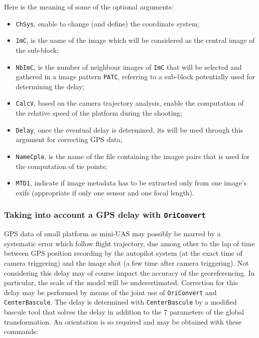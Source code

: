 Here is the meaning of some of the optional arguments:

\begin{itemize}
    \item {\tt ChSys}, enable to change (and define) the coordinate system;
    \item {\tt ImC}, is the name of the image which will be considered as the central image of the sub-block;
    \item {\tt NbImC}, is the number of neighbour images of {\tt ImC} that will be selected and gathered in a image pattern {\tt PATC}, referring to a sub-block potentially used for determining the delay;
                \item {\tt CalcV}, based on the camera trajectory analysis, enable the computation of the relative speed of the platform during the shooting;
                \item {\tt Delay}, once the eventual delay is determined, its will be used through this argument for correcting GPS data;
                \item {\tt NameCple}, is the name of the file containing the images pairs that is used for the computation of tie points;
                \item {\tt MTD1}, indicate if image metadata has to be extracted only from one image's exifs (appropriate if only one sensor and one focal length).
\end{itemize}
\vspace{\baselineskip}

\subsubsection{Taking into account a GPS delay with {\tt OriConvert}}\label{OriConvert:GPSdelay}

GPS data of small platform as mini-UAS may possibly be marred by a systematic error which follow flight trajectory, due among other to the lap of time between GPS position recording by the autopilot system (at the exact time of camera triggering) and the image shot (a few time after camera triggering). Not considering this delay may of course impact the accuracy of the georeferencing. In particular, the scale of the model will be underestimated. Correction for this delay may be performed by means of the joint use of {\tt OriConvert} and {\tt CenterBascule}. The delay is determined with {\tt CenterBascule} by a modified bascule tool that solves the delay in addition to the 7 parameters of the global transformation. An orientation is so required and may be obtained with these commands:

